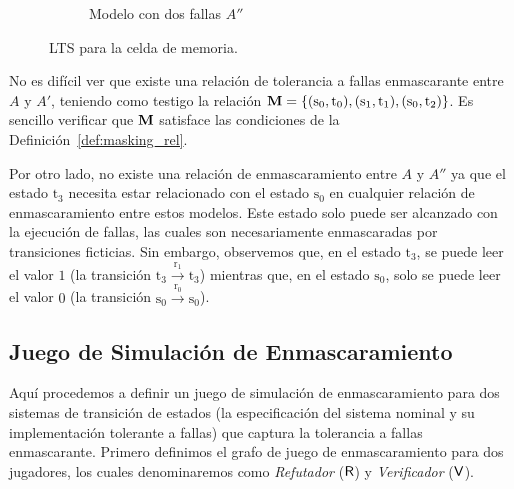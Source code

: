 \begin{example}
\begin{figure}[ht]
\begin{center}
\begin{subfigure}{.32\textwidth}
{
  }
  \caption{Modelo con dos fallas $A''$}\label{figure:exam_1_mem_cell:twofaults}
  \end{subfigure}

  \caption{LTS para la celda de memoria.}
  \label{figure:exam_1_mem_cell}
\end{center}
\end{figure}
\sloppy No es difícil ver que existe una relación de tolerancia a fallas enmascarante entre $A$ y $A'$, teniendo como testigo la relación $\mathbin{\mathbf{M}} = \{(\text{s}_0, \text{t}_0), (\text{s}_1, \text{t}_1), (\text{s}_0, \text{t}_2)\}$. Es sencillo verificar que $\mathbin{\mathbf{M}}$ satisface las condiciones de la Definición~\ref{def:masking_rel}.

Por otro lado, no existe una relación de enmascaramiento entre $A$ y $A''$ ya que el estado $\text{t}_3$ necesita estar relacionado con el estado $\text{s}_0$ en cualquier relación de enmascaramiento entre estos modelos. Este estado solo puede ser alcanzado con la ejecución de fallas, las cuales son necesariamente enmascaradas por transiciones ficticias. Sin embargo, observemos que, en el estado $\text{t}_3$, se puede leer el valor $1$ (la transición $\text{t}_3 \xrightarrow{\text{r}_1} \text{t}_3$) mientras que, en el estado $\text{s}_0$, solo se puede leer el valor $0$ (la transición $\text{s}_0 \xrightarrow{\text{r}_0} \text{s}_0$).
\end{example}
 
\subsection{Juego de Simulación de Enmascaramiento} \label{subsec:mask_sim_game}
Aquí procedemos a definir un juego de simulación de enmascaramiento para dos sistemas de transición de estados (la especificación del sistema nominal y su implementación tolerante a fallas) que captura la tolerancia a fallas enmascarante. Primero definimos el grafo de juego de enmascaramiento para dos jugadores, los cuales denominaremos como \emph{Refutador} ($\mathsf{R}$) y \emph{Verificador}
($\mathsf{V}$).


